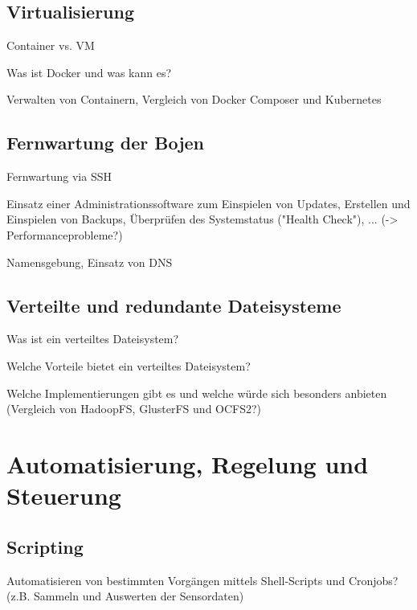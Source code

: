 %
%
%
%
%
%



\subsection{Virtualisierung}
\label{subsec:Virtualisierung}
Container vs. VM

Was ist Docker und was kann es?

Verwalten von Containern, Vergleich von Docker Composer und Kubernetes


\subsection{Fernwartung der Bojen}
\label{subsec:Fernwartung der Bojen}
Fernwartung via SSH

Einsatz einer Administrationssoftware zum Einspielen von Updates, Erstellen und Einspielen von Backups, Überprüfen des Systemstatus ("Health Check"), ...
(-> Performanceprobleme?)

Namensgebung, Einsatz von DNS

\subsection{Verteilte und redundante Dateisysteme}
\label{subsec:Verteilte und redundante Dateisysteme}
Was ist ein verteiltes Dateisystem?

Welche Vorteile bietet ein verteiltes Dateisystem?

Welche Implementierungen gibt es und welche würde sich besonders anbieten (Vergleich von HadoopFS, GlusterFS und OCFS2?)




\section{Automatisierung, Regelung und Steuerung}
\label{sec:Automatisierung, Regelung und Steuerung}
\subsection{Scripting}
\label{subsec:Scripting}
Automatisieren von bestimmten Vorgängen mittels Shell-Scripts und Cronjobs? (z.B. Sammeln und Auswerten der Sensordaten)

